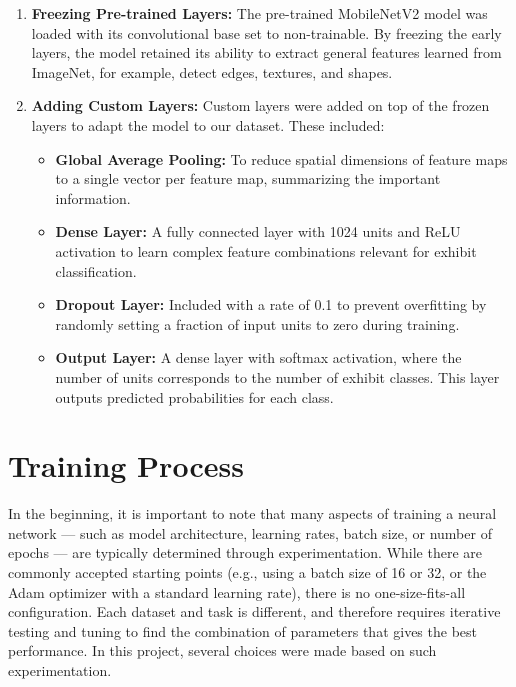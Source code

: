 \begin{enumerate}
   \item \textbf{Freezing Pre-trained Layers:} The pre-trained MobileNetV2 model was loaded with its convolutional base set to non-trainable. By freezing the early layers, the model retained its ability to extract general features learned from ImageNet, for example, detect edges, textures, and shapes.
   
   \item \textbf{Adding Custom Layers:} Custom layers were added on top of the frozen layers to adapt the model to our dataset. These included:
   \begin{itemize}
       \item \textbf{Global Average Pooling:} To reduce spatial dimensions of feature maps to a single vector per feature map, summarizing the important information.
       \item \textbf{Dense Layer:} A fully connected layer with 1024 units and ReLU activation to learn complex feature combinations relevant for exhibit classification.
       \item \textbf{Dropout Layer:} Included with a rate of 0.1 to prevent overfitting by randomly setting a fraction of input units to zero during training.
       \item \textbf{Output Layer:} A dense layer with softmax activation, where the number of units corresponds to the number of exhibit classes. This layer outputs predicted probabilities for each class.
   \end{itemize}
\end{enumerate}

\section{Training Process}

In the beginning, it is important to note that many aspects of training a neural network --- such as model architecture, learning rates, batch size, or number of epochs --- are typically determined through experimentation. While there are commonly accepted starting points (e.g., using a batch size of 16 or 32, or the Adam optimizer with a standard learning rate), there is no one-size-fits-all configuration. Each dataset and task is different, and therefore requires iterative testing and tuning to find the combination of parameters that gives the best performance. In this project, several choices were made based on such experimentation.

